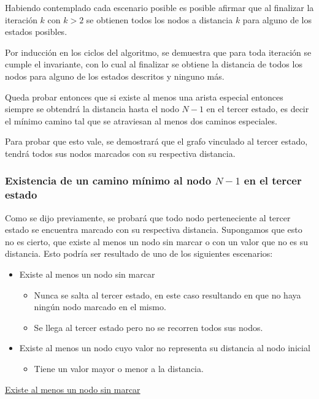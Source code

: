 	Habiendo contemplado cada escenario posible es posible afirmar que al
	finalizar la iteración $k$ con $k > 2$ se obtienen todos los nodos a
	distancia $k$ para alguno de los estados posibles.

	Por inducción en los ciclos del algoritmo, se demuestra que para
	toda iteración se cumple el invariante, con lo cual al finalizar se obtiene
	la distancia de todos los nodos para alguno de los estados descritos y
	ninguno más.

	Queda probar entonces que si existe al menos una arista especial entonces
	siempre se obtendrá la distancia hasta el nodo $N - 1$ en el tercer estado,
	es decir el mínimo camino tal que se atraviesan al menos dos caminos
	especiales.

	Para probar que esto vale, se demostrará que el grafo vinculado al tercer
	estado, tendrá todos sus nodos marcados con su respectiva distancia.

	\subsubsection*{Existencia de un camino mínimo al nodo $N - 1$ en el tercer
	estado}

	Como se dijo previamente, se probará que todo nodo perteneciente al tercer
	estado se encuentra marcado con su respectiva distancia. Supongamos que esto
	no es cierto, que existe al menos un nodo sin marcar o con un valor que no
	es su distancia. Esto podría ser resultado de uno de los siguientes
	escenarios:

	\begin{itemize}
		\item{
			Existe al menos un nodo sin marcar
			\begin{itemize}
				\item{Nunca se salta al tercer estado, en este caso resultando en que no
					haya ningún nodo marcado en el mismo.}
				\item{Se llega al tercer estado pero no se recorren todos sus nodos.}
			\end{itemize}
		}
		\item{
			Existe al menos un nodo cuyo valor no representa su distancia al
			nodo inicial
			\begin{itemize}
				\item{Tiene un valor mayor o menor a la distancia.}
			\end{itemize}
		}
	\end{itemize}

	\underline{Existe al menos un nodo sin marcar}

